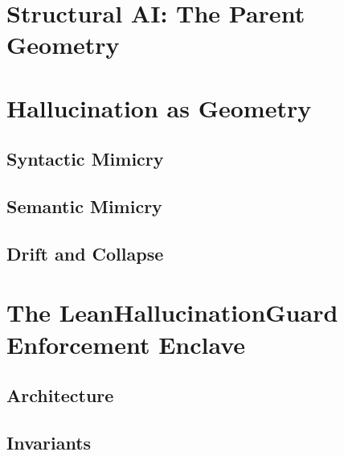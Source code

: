 \section{Structural AI: The Parent Geometry}

\section{Hallucination as Geometry}
\subsection{Syntactic Mimicry}

\subsection{Semantic Mimicry}

\subsection{Drift and Collapse}

\section{The LeanHallucinationGuard Enforcement Enclave}
\subsection{Architecture}

\subsection{Invariants}

